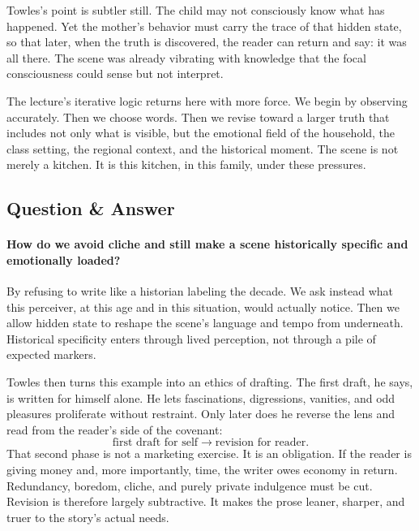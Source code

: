 Towles's point is subtler still. The child may not consciously know what has happened. Yet the mother's behavior must carry the trace of that hidden state, so that later, when the truth is discovered, the reader can return and say: it was all there. The scene was already vibrating with knowledge that the focal consciousness could sense but not interpret.

The lecture's iterative logic returns here with more force. We begin by observing accurately. Then we choose words. Then we revise toward a larger truth that includes not only what is visible, but the emotional field of the household, the class setting, the regional context, and the historical moment. The scene is not merely a kitchen. It is this kitchen, in this family, under these pressures.

\subsection{Question \& Answer}

\paragraph{How do we avoid cliche and still make a scene historically specific and emotionally loaded?}

By refusing to write like a historian labeling the decade. We ask instead what this perceiver, at this age and in this situation, would actually notice. Then we allow hidden state to reshape the scene's language and tempo from underneath. Historical specificity enters through lived perception, not through a pile of expected markers.

Towles then turns this example into an ethics of drafting. The first draft, he says, is written for himself alone. He lets fascinations, digressions, vanities, and odd pleasures proliferate without restraint. Only later does he reverse the lens and read from the reader's side of the covenant:
\begin{equation}
\text{first draft for self} \longrightarrow \text{revision for reader}.
\end{equation}
That second phase is not a marketing exercise. It is an obligation. If the reader is giving money and, more importantly, time, the writer owes economy in return. Redundancy, boredom, cliche, and purely private indulgence must be cut. Revision is therefore largely subtractive. It makes the prose leaner, sharper, and truer to the story's actual needs.


